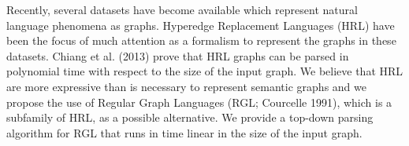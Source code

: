 Recently, several datasets have become available which represent natural language phenomena as graphs. Hyperedge Replacement Languages (HRL) have been the focus of much attention as a formalism to represent the graphs in these datasets. Chiang et al. (2013) prove that HRL graphs can be parsed in polynomial time with respect to the size of the input graph. We believe that HRL are more expressive than is necessary to represent semantic graphs and we propose the use of Regular Graph Languages (RGL; Courcelle 1991), which is a subfamily of HRL, as a possible alternative. We provide a top-down parsing algorithm for RGL that runs in time linear in the size of the input graph.
